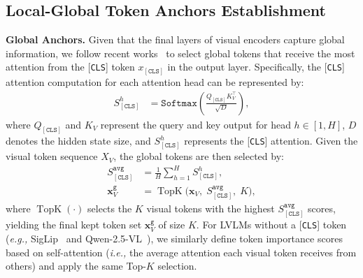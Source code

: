 \subsection{Local-Global Token Anchors Establishment}
\label{sec:token_anchors}

\noindent \textbf{Global Anchors.}
Given that the final layers of visual encoders capture global information, we follow recent works~\cite{zhang2024cls,yang2025visionzip} to select global tokens that receive the most attention from the [\texttt{CLS}] token $x_{[\mathtt{CLS}]}$ in the output layer.
%
%
Specifically, the [\texttt{CLS}] attention computation for each attention head can be represented by:
\begin{equation}
\label{eq:cls-attn}
    \begin{aligned}
        S_{[\mathtt{CLS}]}^h &= \mathtt{Softmax}\!\left(\frac{Q_{[\mathtt{CLS}]}K_V^\top}{\sqrt{D}} \right),
    \end{aligned}
\end{equation}
where $Q_{[\mathtt{CLS}]}$ and $K_V$ represent the query and key output for head $h\in [1, H]$, $D$ denotes the hidden state size, and $S_{[\mathtt{CLS}]}^h$ represents the [\texttt{CLS}] attention. Given the visual token sequence $X_V$, the global tokens are then selected by:
%
\begin{equation}
\begin{split}
    S_{[\mathtt{CLS}]}^{\texttt{avg}}
    &= \frac{1}{H} \sum_{h=1}^H S_{[\mathtt{CLS}]}^h,\\
    \mathbf{x}_{V}^{\mathtt{g}}
    &= \operatorname{TopK}\big(\mathbf{x}_V,\; S_{[\mathtt{CLS}]}^{\texttt{avg}},\; K\big),
\end{split}
\end{equation}
where $\operatorname{TopK}(\cdot)$ selects the $K$ visual tokens with the highest $S_{[\mathtt{CLS}]}^{\texttt{avg}}$ scores, yielding the final kept token set $\mathbf{x}_{V}^{\mathtt{g}}$ of size $K$. For LVLMs without a [\texttt{CLS}] token (\textit{e.g.,} SigLip~\cite{zhai2023sigmoid} and Qwen-2.5-VL~\cite{bai2025qwen2}), we similarly define token importance scores based on self-attention (\textit{i.e.,} the average attention each
visual token receives from others) and apply the same Top-$K$ selection.



